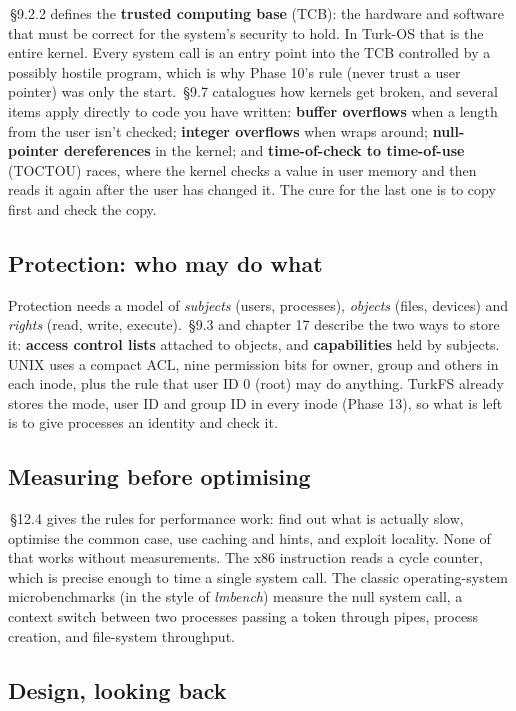\documentclass[11pt,a4paper]{article}
\begin{document}
\MOS\,\S9.2.2 defines the \textbf{trusted computing base} (TCB): the hardware and software that must be correct for
the system's security to hold. In Turk-OS that is the entire kernel. Every system call is an entry point into the TCB
controlled by a possibly hostile program, which is why Phase 10's rule (never trust a user pointer) was only the
start. \MOS\,\S9.7 catalogues how kernels get broken, and several items apply directly to code you have written:
\textbf{buffer overflows} when a length from the user isn't checked; \textbf{integer overflows} when
 wraps around; \textbf{null-pointer dereferences} in the kernel; and \textbf{time-of-check to
time-of-use} (TOCTOU) races, where the kernel checks a value in user memory and then reads it again after the user has
changed it. The cure for the last one is to copy first and check the copy.

\subsection{Protection: who may do what}

Protection needs a model of \emph{subjects} (users, processes), \emph{objects} (files, devices) and \emph{rights}
(read, write, execute). \MOS\,\S9.3 and \OSC chapter 17 describe the two ways to store it: \textbf{access control
lists} attached to objects, and \textbf{capabilities} held by subjects. UNIX uses a compact ACL, nine permission bits
for owner, group and others in each inode, plus the rule that user ID 0 (root) may do anything. TurkFS already stores
the mode, user ID and group ID in every inode (Phase 13), so what is left is to give processes an identity and check it.

\subsection{Measuring before optimising}

\MOS\,\S12.4 gives the rules for performance work: find out what is actually slow, optimise the common case, use
caching and hints, and exploit locality. None of that works without measurements. The x86  instruction
reads a cycle counter, which is precise enough to time a single system call. The classic operating-system
microbenchmarks (in the style of \emph{lmbench}) measure the null system call, a context switch between two processes
passing a token through pipes, process creation, and file-system throughput.

\subsection{Design, looking back}
\end{document}
